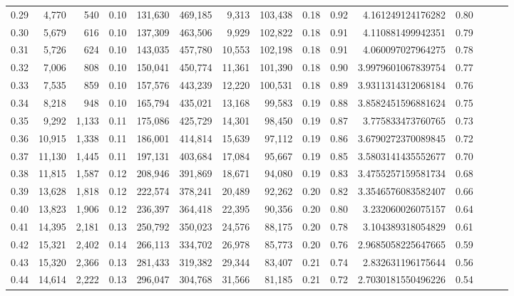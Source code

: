\begin{tabular}{rrrrrrrrrrrrrrr}
0.29 &   4,770 &    540 &  0.10 &  131,630 &  469,185 &    9,313 &  103,438 &  0.18 &  0.92 &       4.161249124176282 &      0.80 \\
0.30 &   5,679 &    616 &  0.10 &  137,309 &  463,506 &    9,929 &  102,822 &  0.18 &  0.91 &       4.110881499942351 &      0.79 \\
0.31 &   5,726 &    624 &  0.10 &  143,035 &  457,780 &   10,553 &  102,198 &  0.18 &  0.91 &       4.060097027964275 &      0.78 \\
0.32 &   7,006 &    808 &  0.10 &  150,041 &  450,774 &   11,361 &  101,390 &  0.18 &  0.90 &      3.9979601067839754 &      0.77 \\
0.33 &   7,535 &    859 &  0.10 &  157,576 &  443,239 &   12,220 &  100,531 &  0.18 &  0.89 &      3.9311314312068184 &      0.76 \\
0.34 &   8,218 &    948 &  0.10 &  165,794 &  435,021 &   13,168 &   99,583 &  0.19 &  0.88 &      3.8582451596881624 &      0.75 \\
0.35 &   9,292 &  1,133 &  0.11 &  175,086 &  425,729 &   14,301 &   98,450 &  0.19 &  0.87 &       3.775833473760765 &      0.73 \\
0.36 &  10,915 &  1,338 &  0.11 &  186,001 &  414,814 &   15,639 &   97,112 &  0.19 &  0.86 &      3.6790272370089845 &      0.72 \\
0.37 &  11,130 &  1,445 &  0.11 &  197,131 &  403,684 &   17,084 &   95,667 &  0.19 &  0.85 &      3.5803141435552677 &      0.70 \\
0.38 &  11,815 &  1,587 &  0.12 &  208,946 &  391,869 &   18,671 &   94,080 &  0.19 &  0.83 &      3.4755257159581734 &      0.68 \\
0.39 &  13,628 &  1,818 &  0.12 &  222,574 &  378,241 &   20,489 &   92,262 &  0.20 &  0.82 &      3.3546576083582407 &      0.66 \\
0.40 &  13,823 &  1,906 &  0.12 &  236,397 &  364,418 &   22,395 &   90,356 &  0.20 &  0.80 &       3.232060026075157 &      0.64 \\
0.41 &  14,395 &  2,181 &  0.13 &  250,792 &  350,023 &   24,576 &   88,175 &  0.20 &  0.78 &       3.104389318054829 &      0.61 \\
0.42 &  15,321 &  2,402 &  0.14 &  266,113 &  334,702 &   26,978 &   85,773 &  0.20 &  0.76 &      2.9685058225647665 &      0.59 \\
0.43 &  15,320 &  2,366 &  0.13 &  281,433 &  319,382 &   29,344 &   83,407 &  0.21 &  0.74 &       2.832631196175644 &      0.56 \\
0.44 &  14,614 &  2,222 &  0.13 &  296,047 &  304,768 &   31,566 &   81,185 &  0.21 &  0.72 &      2.7030181550496226 &      0.54 \\

\end{tabular}
